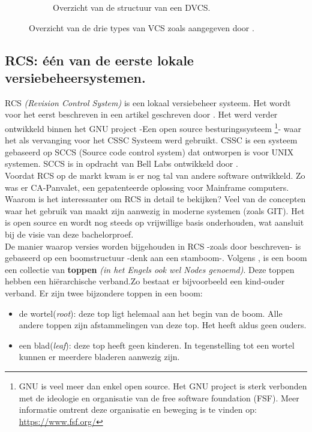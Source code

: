 \begin{figure}[h!]
\begin{subfigure}{.5\textwidth}
	\caption[Overzicht structuur DVCS]{Overzicht van de structuur van een DVCS.}
	\end{subfigure}
	
	\caption[Overzicht types VCS]{Overzicht van de drie types van VCS zoals aangegeven door \textcite{Chacon2014}.}\label{fig_types_cvs}
\end{figure}

	
\subsection{RCS: één van de eerste lokale versiebeheersystemen.}
\label{sec:RCS}


RCS \textit{(Revision Control System)} is een lokaal versiebeheer systeem. Het wordt voor het eerst beschreven in een artikel geschreven door \textcite{Tichy85rcs}. Het werd verder ontwikkeld binnen het GNU project -Een open source besturingssysteem \footnote{GNU is veel meer dan enkel open source. Het GNU project is sterk verbonden met de ideologie en organisatie van de free software foundation (FSF). Meer informatie omtrent deze organisatie en beweging is te vinden op: \url{https://www.fsf.org/}}- waar het als vervanging voor het CSSC Systeem \autocite{GNUCSSC} werd gebruikt. CSSC is een systeem gebaseerd op SCCS (Source code control system) dat ontworpen is voor UNIX systemen. SCCS is in opdracht van Bell Labs ontwikkeld door \textcite{Rochkind1975}.\\

Voordat RCS op de markt kwam is er nog tal van andere software ontwikkeld. Zo was er CA-Panvalet, een gepatenteerde oplossing voor Mainframe computers.\\

Waarom is het interessanter om RCS in detail te bekijken? Veel van de concepten waar het gebruik van maakt zijn aanwezig in moderne systemen (zoals GIT). Het is open source en wordt nog steeds op vrijwillige basis onderhouden, wat aansluit bij de visie van deze bachelorproef.\\

De manier waarop versies worden bijgehouden in RCS -zoals door \textcite{Tichy85rcs} beschreven- is gebaseerd op een boomstructuur -denk aan een stamboom-. Volgens \textcite{Lievens2019}, is een boom een collectie van \textbf{toppen} \textit{(in het Engels ook wel Nodes genoemd)}. Deze toppen hebben een hiërarchische verband.Zo bestaat er bijvoorbeeld een kind-ouder verband. Er zijn twee bijzondere toppen in een boom:

\begin{itemize}
	\item de wortel(\textit{root}): deze top ligt helemaal aan het begin van de boom. Alle andere toppen zijn afstammelingen van deze top. Het heeft aldus geen ouders.
	\item een blad(\textit{leaf}): deze top heeft geen kinderen. In tegenstelling tot een wortel kunnen er meerdere bladeren aanwezig zijn.
\end{itemize}

